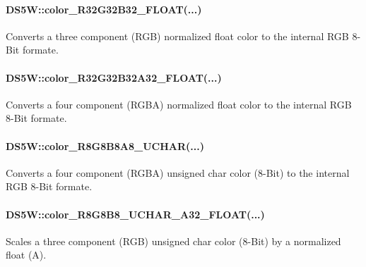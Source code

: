 \paragraph{DS5W::color\_R32G32B32\_FLOAT(...)} 
Converts a three component (RGB) normalized float color to the internal RGB 8-Bit formate.\\


\paragraph{DS5W::color\_R32G32B32A32\_FLOAT(...)}
Converts a four component (RGBA) normalized float color to the internal RGB 8-Bit formate.\\


\paragraph{DS5W::color\_R8G8B8A8\_UCHAR(...)}
Converts a four component (RGBA) unsigned char color (8-Bit) to the internal RGB 8-Bit formate.\\


\paragraph{DS5W::color\_R8G8B8\_UCHAR\_A32\_FLOAT(...)}
Scales a three component (RGB) unsigned char color (8-Bit) by a normalized float (A).\\



\newpage